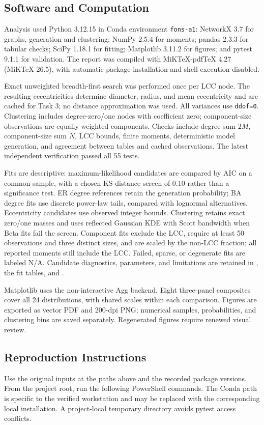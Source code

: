 \subsection{Software and Computation}
Analysis used Python 3.12.15 in Conda environment \texttt{fons-a1}: NetworkX 3.7 for graphs, generation and clustering; NumPy 2.5.4 for moments; pandas 2.3.3 for tabular checks; SciPy 1.18.1 for fitting; Matplotlib 3.11.2 for figures; and pytest 9.1.1 for validation. The report was compiled with MiKTeX-pdfTeX 4.27 (MiKTeX 26.5), with automatic package installation and shell execution disabled.

Exact unweighted breadth-first search was performed once per LCC node. The resulting eccentricities determine diameter, radius, and mean eccentricity and are cached for Task 3; no distance approximation was used. All variances use \texttt{ddof=0}. Clustering includes degree-zero/one nodes with coefficient zero; component-size observations are equally weighted components. Checks include degree sum $2M$, component-size sum $N$, LCC bounds, finite moments, deterministic model generation, and agreement between tables and cached observations. The latest independent verification passed all 55 tests.

Fits are descriptive: maximum-likelihood candidates are compared by AIC on a common sample, with a chosen KS-distance screen of 0.10 rather than a significance test. ER degree references retain the generation probability; BA degree fits use discrete power-law tails, compared with lognormal alternatives. Eccentricity candidates use observed integer bounds. Clustering retains exact zero/one masses and uses reflected Gaussian KDE with Scott bandwidth when Beta fits fail the screen. Component fits exclude the LCC, require at least 50 observations and three distinct sizes, and are scaled by the non-LCC fraction; all reported moments still include the LCC. Failed, sparse, or degenerate fits are labeled N/A. Candidate diagnostics, parameters, and limitations are retained in , the fit tables, and .

Matplotlib uses the non-interactive Agg backend. Eight three-panel composites cover all 24 distributions, with shared scales within each comparison. Figures are exported as vector PDF and 200-dpi PNG; numerical samples, probabilities, and clustering bins are saved separately. Regenerated figures require renewed visual review.

\subsection{Reproduction Instructions}
Use the original inputs at the paths above and the recorded package versions. From the project root, run the following PowerShell commands. The Conda path is specific to the verified workstation and may be replaced with the corresponding local installation. A project-local temporary directory avoids pytest access conflicts.


